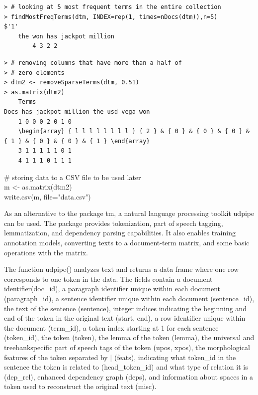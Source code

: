 \documentclass[10pt]{book}
\begin{document}
\begin{verbatim}
> # looking at 5 most frequent terms in the entire collection
> findMostFreqTerms(dtm, INDEX=rep(1, times=nDocs(dtm)),n=5)
$'1'
    the won has jackpot million
        4 3 2 2
\end{verbatim}

\begin{verbatim}
> # removing columns that have more than a half of
> # zero elements
> dtm2 <- removeSparseTerms(dtm, 0.51)
> as.matrix(dtm2)
    Terms
Docs has jackpot million the usd vega won
    1 0 0 0 2 0 1 0
    \begin{array} { l l l l l l l l } { 2 } & { 0 } & { 0 } & { 0 } & { 1 } & { 0 } & { 0 } & { 1 } \end{array}
    3 1 1 1 1 1 0 1
    4 1 1 1 0 1 1 1
\end{verbatim}

\begin{displayquote}
\# storing data to a CSV file to be used later\\
m <- as.matrix(dtm2)\\
write.csv(m, file="data.csv")
\end{displayquote}

As an alternative to the package tm, a natural language processing toolkit udpipe can be used. The package provides tokenization, part of speech tagging, lemmatization, and dependency parsing capabilities. It also enables training annotation models, converting texts to a document-term matrix, and some basic operations with the matrix.

The function udpipe() analyzes text and returns a data frame where one row corresponds to one token in the data. The fields contain a document identifier(doc\_id), a paragraph identifier unique within each document (paragraph\_id), a sentence identifier unique within each document (sentence\_id), the text of the sentence (sentence), integer indices indicating the beginning and end of the token in the original text (start, end), a row identifier unique within the document (term\_id), a token index starting at 1 for each sentence (token\_id), the token (token), the lemma of the token (lemma), the universal and treebankspecific part of speech tags of the token (upos, xpos), the morphological features of the token separated by | (feats), indicating what token\_id in the sentence the token is related to (head\_token\_id) and what type of relation it is (dep\_rel), enhanced dependency graph (deps), and information about spaces in a token used to reconstruct the original text (misc).
\end{document}
